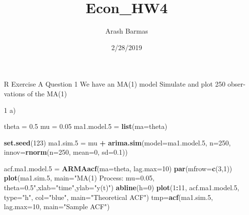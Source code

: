 \documentclass[]{article}
\title{Econ\_HW4}
\author{Arash Barmas}
\date{2/28/2019}
\newenvironment{Shaded}{\begin{snugshade}}{\end{snugshade}}
\newcommand{\KeywordTok}[1]{\textcolor[rgb]{0.13,0.29,0.53}{\textbf{#1}}}
\newcommand{\DataTypeTok}[1]{\textcolor[rgb]{0.13,0.29,0.53}{#1}}
\newcommand{\DecValTok}[1]{\textcolor[rgb]{0.00,0.00,0.81}{#1}}
\newcommand{\FloatTok}[1]{\textcolor[rgb]{0.00,0.00,0.81}{#1}}
\newcommand{\StringTok}[1]{\textcolor[rgb]{0.31,0.60,0.02}{#1}}
\newcommand{\OperatorTok}[1]{\textcolor[rgb]{0.81,0.36,0.00}{\textbf{#1}}}
\newcommand{\NormalTok}[1]{#1}
\begin{document}
\maketitle

R Exercise A Question 1 We have an MA(1) model Simulate and plot 250
obser- vations of the MA(1)

1 a)

\begin{Shaded}
\begin{Highlighting}[]
\NormalTok{theta =}\StringTok{ }\FloatTok{0.5}
\NormalTok{mu    =}\StringTok{ }\FloatTok{0.05}
\NormalTok{ma1.model.}\DecValTok{5}\NormalTok{ =}\StringTok{ }\KeywordTok{list}\NormalTok{(}\DataTypeTok{ma=}\NormalTok{theta)}

\KeywordTok{set.seed}\NormalTok{(}\DecValTok{123}\NormalTok{)}
\NormalTok{ma1.sim.}\DecValTok{5}\NormalTok{ =}\StringTok{ }\NormalTok{mu }\OperatorTok{+}\StringTok{ }\KeywordTok{arima.sim}\NormalTok{(}\DataTypeTok{model=}\NormalTok{ma1.model.}\DecValTok{5}\NormalTok{, }\DataTypeTok{n=}\DecValTok{250}\NormalTok{,}
                         \DataTypeTok{innov=}\KeywordTok{rnorm}\NormalTok{(}\DataTypeTok{n=}\DecValTok{250}\NormalTok{, }\DataTypeTok{mean=}\DecValTok{0}\NormalTok{, }\DataTypeTok{sd=}\FloatTok{0.1}\NormalTok{))}

\NormalTok{acf.ma1.model.}\DecValTok{5}\NormalTok{ =}\StringTok{ }\KeywordTok{ARMAacf}\NormalTok{(}\DataTypeTok{ma=}\NormalTok{theta, }\DataTypeTok{lag.max=}\DecValTok{10}\NormalTok{)}
\KeywordTok{par}\NormalTok{(}\DataTypeTok{mfrow=}\KeywordTok{c}\NormalTok{(}\DecValTok{3}\NormalTok{,}\DecValTok{1}\NormalTok{))}
    \KeywordTok{plot}\NormalTok{(ma1.sim.}\DecValTok{5}\NormalTok{, }\DataTypeTok{main=}\StringTok{"MA(1) Process: mu=0.05, theta=0.5"}\NormalTok{,}\DataTypeTok{xlab=}\StringTok{"time"}\NormalTok{,}\DataTypeTok{ylab=}\StringTok{"y(t)"}\NormalTok{)}
    \KeywordTok{abline}\NormalTok{(}\DataTypeTok{h=}\DecValTok{0}\NormalTok{)}
    \KeywordTok{plot}\NormalTok{(}\DecValTok{1}\OperatorTok{:}\DecValTok{11}\NormalTok{, acf.ma1.model.}\DecValTok{5}\NormalTok{, }\DataTypeTok{type=}\StringTok{"h"}\NormalTok{, }\DataTypeTok{col=}\StringTok{"blue"}\NormalTok{, }\DataTypeTok{main=}\StringTok{"Theoretical ACF"}\NormalTok{)}
\NormalTok{    tmp=}\KeywordTok{acf}\NormalTok{(ma1.sim.}\DecValTok{5}\NormalTok{, }\DataTypeTok{lag.max=}\DecValTok{10}\NormalTok{, }\DataTypeTok{main=}\StringTok{"Sample ACF"}\NormalTok{)}
\end{Highlighting}
\end{Shaded}
\end{document}
